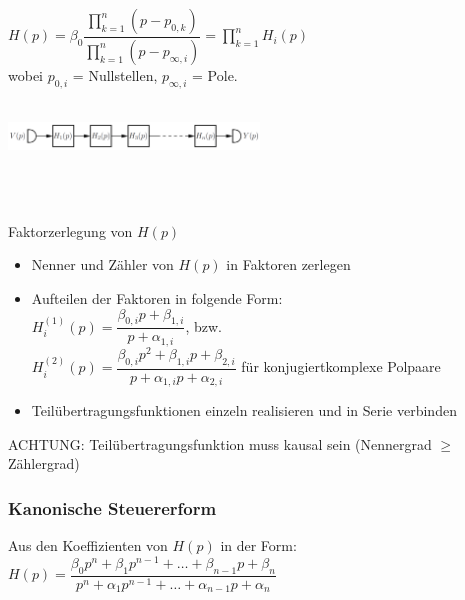 \documentclass[a4paper,landscape,6pt]{article}
\begin{document}
\begin{multicols}{3}
$H(p) = \beta_0 \dfrac{\prod_{k=1}^{n}(p-p_{0,k})}{\prod_{k=1}^{n}(p - p_{\infty,i})} = \prod\limits_{k=1}^{n}H_i(p)$\\

wobei $p_{0,i}$ = Nullstellen, $p_{\infty,i}$ = Pole.
\\\\
\begin{minipage}[t]{0.6\textwidth}
	\includegraphics[width=0.5\textwidth]{images_ssp/Kaskadenform}\\
\end{minipage}
\\\\
\begin{cookbox}{Faktorzerlegung von $H(p)$}
	\begin{itemize}
		\item[1)] Nenner und Zähler von $H(p)$ in Faktoren zerlegen
		\item[2)] Aufteilen der Faktoren in folgende Form:\\
		$H_i^{(1)}(p) = \dfrac{\beta_{0,i} p + \beta_{1,i}}{p + \alpha_{1,i}}$, bzw. \\
		$H_i^{(2)}(p) = \dfrac{\beta_{0,i} p^2 + \beta_{1,i} p + \beta_{2,i}}{p + \alpha_{1,i} p + \alpha_{2,i}}$ für konjugiertkomplexe Polpaare \\
		\item[3)] Teilübertragungsfunktionen einzeln realisieren und in Serie verbinden
	\end{itemize}
ACHTUNG: Teilübertragungsfunktion muss kausal sein (Nennergrad $\ge$ Zählergrad)\\
\end{cookbox}


\subsubsection*{Kanonische Steuererform}
Aus den Koeffizienten von $H(p)$ in der Form:\\

$H(p) = \dfrac{\beta_0 p^n + \beta_1 p^{n-1} + \dots + \beta_{n-1} p + \beta_n}{p^n + \alpha_1 p^{n-1} + \dots + \alpha_{n-1} p + \alpha_n} $\\


\end{multicols}
\end{document}
